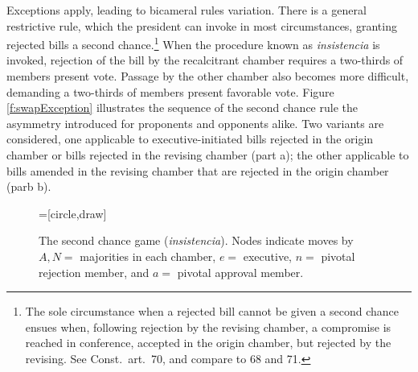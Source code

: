 \documentclass[letter,12pt]{article}
\begin{document}
Exceptions apply, leading to bicameral rules variation. There is a general restrictive rule, which the president can invoke in most circumstances, granting rejected bills a second chance.\footnote{The sole circumstance when a rejected bill cannot be given a second chance ensues when, following rejection by the revising chamber, a compromise is reached in conference, accepted in the origin chamber, but rejected by the revising. See Const.\ art.\ 70, and compare to 68 and 71.} When the procedure known as \emph{insistencia} is invoked, rejection of the bill by the recalcitrant chamber requires a two-thirds of members present vote. Passage by the other chamber also becomes more difficult, demanding a two-thirds of members present favorable vote. Figure \ref{f:swapException} illustrates the sequence of the second chance rule the asymmetry introduced for proponents and opponents alike. Two variants are considered, one applicable to executive-initiated bills rejected in the origin chamber or bills rejected in the revising chamber (part a); the other applicable to bills amended in the revising chamber that are rejected in the origin chamber (parb b). 

\begin{figure}
  \begin{center}
    =[circle,draw]
  \caption{The second chance game (\emph{insistencia}). Nodes indicate moves by $A,N=$ majorities in each chamber, $e=$ executive, $n=$ pivotal rejection member, and $a=$ pivotal approval member.}\label{f:2chanceGame}
  \end{center}
\end{figure}
\end{document}
